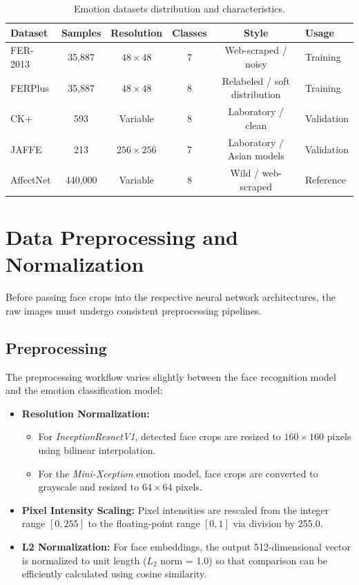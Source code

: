 \begin{table}[H]
\centering
\caption{Emotion datasets distribution and characteristics.}
\label{tab:emotion-datasets}
\begin{tabular}{lccccl}
\toprule
\textbf{Dataset} & \textbf{Samples} & \textbf{Resolution} & \textbf{Classes} & \textbf{Style} & \textbf{Usage} \\
\midrule
FER-2013 & 35,887 & $48 \times 48$ & 7 & Web-scraped / noisy & Training \\
FERPlus & 35,887 & $48 \times 48$ & 8 & Relabeled / soft distribution & Training \\
CK+ & 593 & Variable & 8 & Laboratory / clean & Validation \\
JAFFE & 213 & $256 \times 256$ & 7 & Laboratory / Asian models & Validation \\
AffectNet & 440,000 & Variable & 8 & Wild / web-scraped & Reference \\
\bottomrule
\end{tabular}
\end{table}

\section{Data Preprocessing and Normalization}
Before passing face crops into the respective neural network architectures, the raw images must undergo consistent preprocessing pipelines.

\subsection{Preprocessing}
The preprocessing workflow varies slightly between the face recognition model and the emotion classification model:
\begin{itemize}
    \item \textbf{Resolution Normalization:}
    \begin{itemize}
        \item For \textit{InceptionResnetV1}, detected face crops are resized to $160 \times 160$ pixels using bilinear interpolation.
        \item For the \textit{Mini-Xception} emotion model, face crops are converted to grayscale and resized to $64 \times 64$ pixels.
    \end{itemize}
    \item \textbf{Pixel Intensity Scaling:} Pixel intensities are rescaled from the integer range $[0, 255]$ to the floating-point range $[0, 1]$ via division by 255.0.
    \item \textbf{L2 Normalization:} For face embeddings, the output 512-dimensional vector is normalized to unit length ($L_2$ norm = 1.0) so that comparison can be efficiently calculated using cosine similarity.
\end{itemize}

